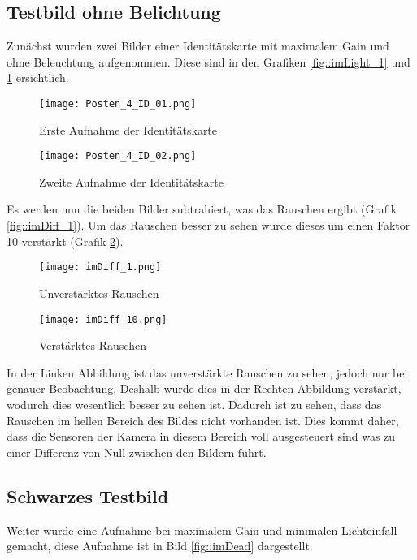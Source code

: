 \subsection{Testbild ohne Belichtung}
Zunächst wurden zwei Bilder einer Identitätskarte mit maximalem Gain und ohne Beleuchtung aufgenommen. Diese sind in den Grafiken \ref{fig::imLight_1} und \ref{fig::imLight_2} ersichtlich.

\begin{figure}[ht]
	\begin{minipage}{0.45\textwidth}
		\centering
		\texttt{[image: Posten\_4\_ID\_01.png]}
		\caption{Erste Aufnahme der Identitätskarte}
		\label{fig::imLight_1}
	\end{minipage}
	\begin{minipage}{0.45\textwidth}
		\centering
		\texttt{[image: Posten\_4\_ID\_02.png]}
		\caption{Zweite Aufnahme der Identitätskarte}
		\label{fig::imLight_2}
	\end{minipage}
\end{figure}

Es werden nun die beiden Bilder subtrahiert, was das Rauschen ergibt (Grafik \ref{fig::imDiff_1}). Um das Rauschen besser zu sehen wurde dieses um einen Faktor 10 verstärkt (Grafik \ref{fig::imDiff_10}).

\begin{figure}[ht]
	\begin{minipage}{0.45\textwidth}
		\centering
		\texttt{[image: imDiff\_1.png]}
		\caption{Unverstärktes Rauschen}
		\label{fig::imDiff_1}
	\end{minipage}
	\begin{minipage}{0.45\textwidth}
		\centering
		\texttt{[image: imDiff\_10.png]}
		\caption{Verstärktes Rauschen}
		\label{fig::imDiff_10}
	\end{minipage}
\end{figure}

In der Linken Abbildung ist das unverstärkte Rauschen zu sehen, jedoch nur bei genauer Beobachtung. Deshalb wurde dies in der Rechten Abbildung verstärkt, wodurch dies wesentlich besser zu sehen ist. Dadurch ist zu sehen, dass das Rauschen im hellen Bereich des Bildes nicht vorhanden ist. Dies kommt daher, dass die Sensoren der Kamera in diesem Bereich voll ausgesteuert sind was zu einer Differenz von Null zwischen den Bildern führt.
\newpage
\subsection{Schwarzes Testbild}
Weiter wurde eine Aufnahme bei maximalem Gain und minimalen Lichteinfall gemacht, diese Aufnahme ist in Bild \ref{fig::imDead} dargestellt.

